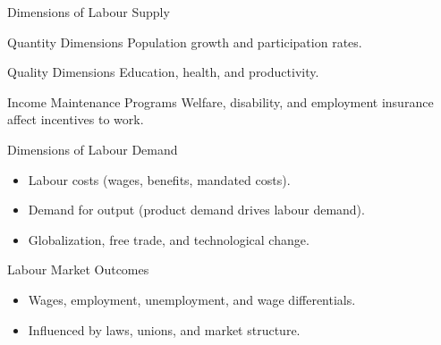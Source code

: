 \documentclass[aspectratio=169]{beamer}
\begin{document}
\begin{frame}{Dimensions of Labour Supply}
\begin{block}{Quantity Dimensions}
Population growth and participation rates.
\end{block}
\begin{block}{Quality Dimensions}
Education, health, and productivity.
\end{block}
\begin{block}{Income Maintenance Programs}
Welfare, disability, and employment insurance affect incentives to work.
\end{block}
\end{frame}

\begin{frame}{Dimensions of Labour Demand}
\begin{itemize}
  \item Labour costs (wages, benefits, mandated costs).
  \item Demand for output (product demand drives labour demand).
  \item Globalization, free trade, and technological change.
\end{itemize}
\end{frame}

\begin{frame}{Labour Market Outcomes}
\begin{itemize}
  \item Wages, employment, unemployment, and wage differentials.
  \item Influenced by laws, unions, and market structure.
\end{itemize}
\end{frame}
\end{document}
